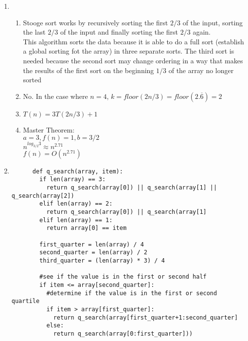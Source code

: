 \documentclass{article}
\begin{document}
\begin{enumerate}
\begin{enumerate}
    \end{enumerate}
    \item\begin{enumerate}
      \item Stooge sort works by recursively sorting the first $2/3$ of the input, sorting the last $2/3$ of the input and finally sorting the first $2/3$ again.\\
      This algorithm sorts the data because it is able to do a full sort (establish a global sorting fot the array) in three separate sorts.  The third sort is needed because the second sort may change ordering in a way that makes the results of the first sort on the beginning $1/3$ of the array no longer sorted
      \item No.  In the case where $n=4$, $k = floor(2n/3) = floor(2.\overline{6}) = 2$
      \item $T(n) = 3T(2n/3) + 1$
      \item Master Theorem:\\ 
        $a=3, f(n)=1, b=3/2$\\
        $n^{log_{3/2}3} \approx n^{2.71}$\\
        $f(n) = O(n^{2.71})$
    \end{enumerate}
    \item\begin{verbatim}
      def q_search(array, item):
        if len(array) == 3:
          return q_search(array[0]) || q_search(array[1] || q_search(array[2])
        elif len(array) == 2:
          return q_search(array[0]) || q_search(array[1]
        elif len(array) == 1:
          return array[0] == item

        first_quarter = len(array) / 4
        second_quarter = len(array) / 2
        third_quarter = (len(array) * 3) / 4

        #see if the value is in the first or second half
        if item <= array[second_quarter]:
          #determine if the value is in the first or second quartile
          if item > array[first_quarter]:
            return q_search(array[first_quarter+1:second_quarter]
          else:
            return q_search(array[0:first_quarter]))


\end{verbatim}
\end{enumerate}
\end{document}
